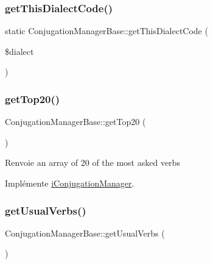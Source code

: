 \subsubsection{\texorpdfstring{get\+This\+Dialect\+Code()}{getThisDialectCode()}}
{\footnotesize\ttfamily static Conjugation\+Manager\+Base\+::get\+This\+Dialect\+Code (\begin{DoxyParamCaption}\item[{}]{\$dialect }\end{DoxyParamCaption})\hspace{0.3cm}{\ttfamily [static]}}

\hypertarget{class_conjugation_manager_base_a63728ecfb3a2eb259accf59dd79e9c26}{}\label{class_conjugation_manager_base_a63728ecfb3a2eb259accf59dd79e9c26} 
\subsubsection{\texorpdfstring{get\+Top20()}{getTop20()}}
{\footnotesize\ttfamily Conjugation\+Manager\+Base\+::get\+Top20 (\begin{DoxyParamCaption}{ }\end{DoxyParamCaption})}

\begin{DoxyReturn}{Renvoie}
an array of 20 of the most asked verbs 
\end{DoxyReturn}


Implémente \hyperlink{interfacei_conjugation_manager_a0273fc00cbbf9e83823d571e3e2c8945}{i\+Conjugation\+Manager}.

\hypertarget{class_conjugation_manager_base_a1dff05e951fe4453247a97f5aff5bc83}{}\label{class_conjugation_manager_base_a1dff05e951fe4453247a97f5aff5bc83} 
\subsubsection{\texorpdfstring{get\+Usual\+Verbs()}{getUsualVerbs()}}
{\footnotesize\ttfamily Conjugation\+Manager\+Base\+::get\+Usual\+Verbs (\begin{DoxyParamCaption}{ }\end{DoxyParamCaption})\hspace{0.3cm}{\ttfamily [abstract]}}

